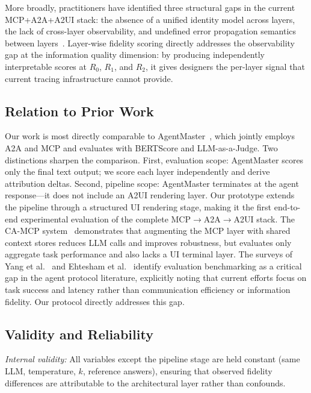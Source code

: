 \documentclass[10pt,journal,compsoc]{IEEEtran}
\begin{document}
More broadly, practitioners have identified three structural gaps in the current
MCP+A2A+A2UI stack: the absence of a unified identity model across layers, the
lack of cross-layer observability, and undefined error propagation semantics
between layers~\cite{mitra2026stack}. Layer-wise fidelity scoring directly
addresses the observability gap at the information quality dimension: by producing
independently interpretable scores at $R_0$, $R_1$, and $R_2$, it gives designers
the per-layer signal that current tracing infrastructure cannot provide.

\subsection{Relation to Prior Work}
\label{sec:priorwork}

Our work is most directly comparable to
AgentMaster~\cite{liao2025agentmaster}, which jointly employs A2A and MCP and
evaluates with BERTScore and LLM-as-a-Judge. Two distinctions sharpen the
comparison. First, evaluation scope: AgentMaster scores only the final text
output; we score each layer independently and derive attribution deltas. Second,
pipeline scope: AgentMaster terminates at the agent response---it does not include
an A2UI rendering layer. Our prototype extends the pipeline through a structured UI
rendering stage, making it the first end-to-end experimental evaluation of the
complete MCP$\rightarrow$A2A$\rightarrow$A2UI stack. The CA-MCP
system~\cite{jayanti2026camcp} demonstrates that augmenting the MCP layer with
shared context stores reduces LLM calls and improves robustness, but evaluates
only aggregate task performance and also lacks a UI terminal layer. The surveys of
Yang et al.~\cite{yang2025survey} and Ehtesham et al.~\cite{ehtesham2025survey}
identify evaluation benchmarking as a critical gap in the agent protocol
literature, explicitly noting that current efforts focus on task success and
latency rather than communication efficiency or information fidelity. Our protocol
directly addresses this gap.

\subsection{Validity and Reliability}
\label{sec:validity}

\emph{Internal validity:} All variables except the pipeline stage are held
constant (same LLM, temperature, $k$, reference answers), ensuring that observed
fidelity differences are attributable to the architectural layer rather than
confounds.
\end{document}
